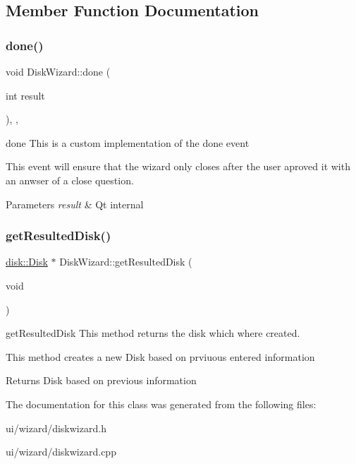 \subsection{Member Function Documentation}
\mbox{\label{class_disk_wizard_aa0569c57c5568c9b03bbae99661f11ac}} 
\subsubsection{\texorpdfstring{done()}{done()}}
{\footnotesize\ttfamily void Disk\+Wizard\+::done (\begin{DoxyParamCaption}\item[{int}]{result }\end{DoxyParamCaption})\hspace{0.3cm}{\ttfamily [override]}, {\ttfamily [protected]}, {\ttfamily [virtual]}}



done This is a custom implementation of the done event 

This event will ensure that the wizard only closes after the user aproved it with an anwser of a close question. 
\begin{DoxyParams}{Parameters}
{\em result} & Qt internal \\
\hline
\end{DoxyParams}
\mbox{\label{class_disk_wizard_a301923c0d1511e93504a61f465796ca7}} 
\subsubsection{\texorpdfstring{get\+Resulted\+Disk()}{getResultedDisk()}}
{\footnotesize\ttfamily \mbox{\hyperlink{classdisk_1_1_disk}{disk\+::\+Disk}} $\ast$ Disk\+Wizard\+::get\+Resulted\+Disk (\begin{DoxyParamCaption}\item[{void}]{ }\end{DoxyParamCaption})}



get\+Resulted\+Disk This method returns the disk which where created. 

This method creates a new Disk based on prviuous entered information \begin{DoxyReturn}{Returns}
Disk based on previous information 
\end{DoxyReturn}


The documentation for this class was generated from the following files\+:\begin{DoxyCompactItemize}
\item 
ui/wizard/diskwizard.\+h\item 
ui/wizard/diskwizard.\+cpp\end{DoxyCompactItemize}
